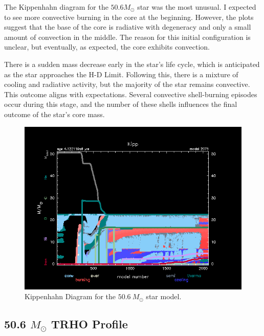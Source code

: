 \documentclass[fleqn,usenatbib]{mnras}
\begin{document}
\par The Kippenhahn diagram for the \(50.6 M_\odot\) star was the most unusual. I expected to see more convective burning in the core at the beginning. However, the plots suggest that the base of the core is radiative with degeneracy and only a small amount of convection in the middle. The reason for this initial configuration is unclear, but eventually, as expected, the core exhibits convection.

\par There is a sudden mass decrease early in the star's life cycle, which is anticipated as the star approaches the H-D Limit. Following this, there is a mixture of cooling and radiative activity, but the majority of the star remains convective. This outcome aligns with expectations. Several convective shell-burning episodes occur during this stage, and the number of these shells influences the final outcome of the star's core mass.

\begin{figure}
    \centering
    \includegraphics[width=\columnwidth]{50.6 kipp.png}
    \caption{Kippenhahn Diagram for the \(50.6\ M_\odot\) star model.}
    \label{fig:50.6_Msol_kipp_figure}
\end{figure}



\subsection{50.6 \(M_\odot\) TRHO Profile}
\end{document}
